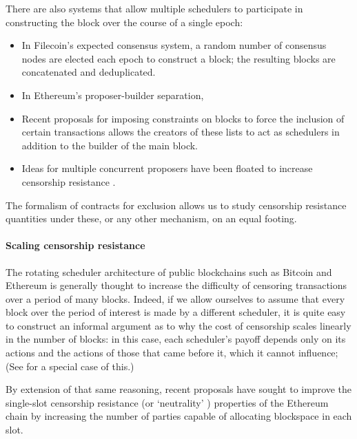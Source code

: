 There are also systems that allow multiple schedulers to participate in constructing the block over the course of a single epoch:
%
\begin{itemize}

  \item 
    In Filecoin's expected consensus system, a random number of consensus nodes are elected each epoch to construct a block; the resulting blocks are concatenated and deduplicated.

  \item
    In Ethereum's proposer-builder separation,

  \item
    Recent proposals for imposing constraints on blocks to force the inclusion of certain transactions allows the creators of these lists to act as schedulers in addition to the builder of the main block.

  \item
    Ideas for multiple concurrent proposers have been floated to increase censorship resistance \cite{FPR}.

\end{itemize}
%
The formalism of contracts for exclusion allows us to study censorship resistance quantities under these, or any other mechanism, on an equal footing.


\paragraph{Scaling censorship resistance}

The rotating scheduler architecture of public blockchains such as Bitcoin and Ethereum is generally thought to increase the difficulty of censoring transactions over a period of many blocks.
%
Indeed, if we allow ourselves to assume that every block over the period of interest is made by a different scheduler, it is quite easy to construct an informal argument as to why the cost of censorship scales linearly in the number of blocks: in this case, each scheduler's payoff depends only on its actions and the actions of those that came before it, which it cannot influence;
%
(See \cite[\S6.1]{FPR} for a special case of this.)


By extension of that same reasoning, recent proposals \cite{FPR,2024forkchoice} have sought to improve the single-slot censorship resistance (or `neutrality' \cite{ma2024uncrowdable}) properties of the Ethereum chain by increasing the number of parties capable of allocating blockspace in each slot.

